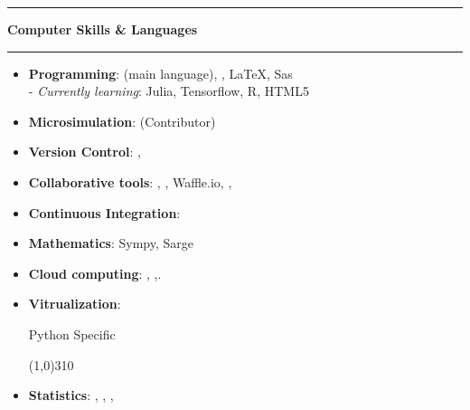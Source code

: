 \documentclass[a4paper,11pt]{article} %
\newcommand{\myhref}[3][blue]{\href{#2}{\color{#1}{#3}}}%
\newcommand{\titre}[1]{%
	\begin{center}
	\rule{\textwidth}{1pt}
	\par\vspace{0.1cm}
        \textbf{\large #1}
	\par\rule{\textwidth}{1pt}
	\end{center}
	}
\begin{document}
\titre{Computer Skills \& Languages}

\begin{itemize}
\item \textbf{Programming}:  \myhref[black-gray]{https://www.python.org}{Python}(main language), \myhref[black-gray]{https://www.gnu.org/software/bash/}{Bash}, \LaTeX, Sas \\
  \hspace*{0.1cm}- \emph{Currently learning}: Julia, Tensorflow, R, HTML5
\item \textbf{Microsimulation}:   \myhref[black-gray]{https://fr.openfisca.org}{OpenFisca} (Contributor)
\item \textbf{Version Control}:  \myhref[black-gray]{https://git-scm.com}{git}, \myhref[black-gray]{https://gitless.com}{gitless}


\item \textbf{Collaborative tools}:  \myhref[black-gray]{https://www.github.com/}{GitHub}, \myhref[black-gray]{https://www.github.com/}{Slack}, Waffle.io, \myhref[black-gray]{https://colab.research.google.com/}{Google Colab}, \myhref[black-gray]{https://visualstudio.microsoft.com/services/live-share/}{VS Live Share}

 \item \textbf{Continuous Integration}:  \myhref[black-gray]{https://travis-ci.com/}{Travis CI}
\item \textbf{Mathematics}: Sympy, Sarge
\item \textbf{Cloud computing}: \myhref[black-gray]{https://aws.amazon.com/fr/}{AWS},  \myhref[black-gray]{https://www.scaleway.com}{Scaleway},\myhref[black-gray]{https://www.kaggle.com/docs/kernels}{Kaggle Kernels}.
\item \textbf{Vitrualization}: \myhref[black-gray]{https://github.com/docker/docker-ce}{Docker}

 Python Specific
 \vspace{-0.5cm}
 \begin{flushleft}
\line(1,0){310}
\end{flushleft}
 \item \textbf{Statistics}: \myhref[black-gray]{http://pandas.pydata.org}{Pandas}, \myhref[black-gray]{http://www.statsmodels.org/stable/}{Statsmodels}, \myhref[black-gray]{https://bashtage.github.io/linearmodels/}{linearmodels}, \myhref[black-gray]{https://scikit-learn.org/stable/}{Scikit-Learn} 


\end{itemize}
\end{document}
